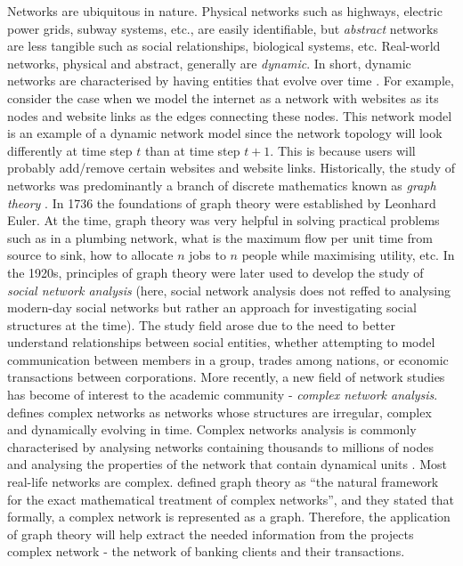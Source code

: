 Networks are ubiquitous in nature. Physical networks such as highways, electric power grids, subway systems, etc., are easily identifiable, but \textit{abstract} networks are less tangible such as social relationships, biological systems, etc. Real-world networks, physical and abstract, generally are \textit{dynamic}. In short, dynamic networks are characterised by having entities that evolve over time \citep*{boccaletti2006complex}. For example, consider the case when we model the internet as a network with websites as its nodes and website links as the edges connecting these nodes. This network model is an example of a dynamic network model since the network topology will look differently at time step $t$ than at time step $t+1$. This is because users will probably add/remove certain websites and website links. Historically, the study of networks was predominantly a branch of discrete mathematics known as \textit{graph theory} \citep{boccaletti2006complex}. In 1736 the foundations of graph theory were established by Leonhard Euler. At the time, graph theory was very helpful in solving practical problems such as in a plumbing network, what is the maximum flow per unit time from source to sink, how to allocate $n$ jobs to $n$ people while maximising utility, etc. In the 1920s, principles of graph theory were later used to develop the study of \textit{social network analysis} (here, social network analysis does not reffed to analysing modern-day social networks but rather an approach for investigating social structures at the time). The study field arose due to the need to better understand relationships between social entities, whether attempting to model communication between members in a group, trades among nations, or economic transactions between corporations. More recently, a new field of network studies has become of interest to the academic community - \textit{complex network analysis}. \citet{boccaletti2006complex} defines complex networks as networks whose structures are irregular, complex and dynamically evolving in time. Complex networks analysis is commonly characterised by analysing networks containing thousands to millions of nodes and analysing the properties of the network that contain dynamical units \citep{boccaletti2006complex}. Most real-life networks are complex. \citet{boccaletti2006complex} defined graph theory as ``the natural framework for the exact mathematical treatment of complex networks'', and they stated that formally, a complex network is represented as a graph. Therefore, the application of graph theory will help extract the needed information from the projects complex network - the network of banking clients and their transactions.

